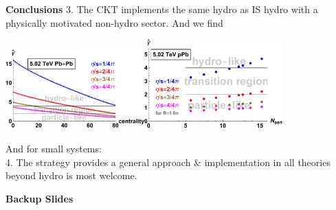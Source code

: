 \documentclass[9pt,a4paper,unknownkeysallowed,xcolor=dvipsnames,aspectratio=43]{beamer}
\begin{document}
\begin{frame}{\bf\huge Conclusions}
\setcounter{page}{0}
\vspace{2mm}
{\color{teablue}3.} {\color{darkred}The CKT implements the same hydro as IS hydro with a physically motivated non-hydro sector. And we find}\\
\vspace{2mm}
\begin{center}
\includegraphics[width=0.4\textwidth]{fig/PbPb}\hspace{0.1\textwidth}\includegraphics[width=0.4\textwidth]{fig/pPb}
\end{center}
\vspace{2mm}
And for small systems: {\color{darkred}
}\\
\vspace{4mm}
{\color{teablue}4.} {\color{darkred} The strategy provides a general approach \& implementation in all theories beyond hydro is most welcome.}
\end{frame}
%
%
\begin{frame}
\setcounter{page}{0}
\vspace*{\fill}
\begin{center}
{\Huge\bf\color{gray}Backup Slides}
\end{center}
\vspace*{\fill}
\end{frame}
\end{document}
